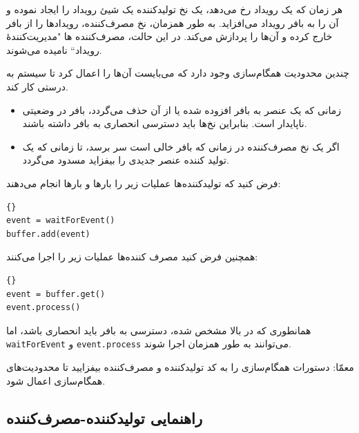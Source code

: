 \documentclass{book}
\newcommand{\clearemptydoublepage}{}%
\begin{document}
    هر زمان که یک رویداد رخ می‌دهد، یک نخ تولید‌کننده یک شیئ رویداد را ایجاد نموده و آن را به بافر رویداد می‌افزاید. 
    به طور همزمان، نخ مصرف‌کننده، رویدادها را از بافر خارج کرده و آن‌ها را پردازش می‌کند. 
    در این حالت، مصرف‌کننده ها "مدیریت‌کنندهٔ رویداد`` نامیده می‌شوند.

    چندین محدودیت همگام‌سازی وجود دارد که می‌بایست آن‌ها را اعمال کرد تا سیستم به درستی کار کند. 

\begin{itemize}

\item 
    زمانی که یک عنصر به بافر افزوده شده یا از آن حذف می‌گردد، بافر در وضعیتی ناپایدار است.
    بنابراین نخ‌ها باید دسترسی انحصاری به بافر داشته باشند.
    
\item 
    اگر یک نخ مصرف‌کننده در زمانی که بافر خالی است سر برسد، تا زمانی که یک تولید کننده عنصر جدیدی را بیفزاید مسدود می‌گردد.

\end{itemize}

    فرض کنید که تولیدکننده‌ها عملیات زیر را بارها و بارها انجام می‌دهند:

\begin{latin}
\begin{lstlisting}[title=\rl{کد پایهٔ تولیدکننده}]{}
event = waitForEvent()
buffer.add(event)
\end{lstlisting}
\end{latin}

    همچنین فرض کنید مصرف کننده‌ها عملیات زیر را اجرا می‌کنند:

\begin{latin}
\begin{lstlisting}[title=\rl{کد پایهٔ مصرف‌کننده}]{}
event = buffer.get()
event.process()
\end{lstlisting}
\end{latin}

    همانطوری که در بالا مشخص شده، دسترسی به بافر باید انحصاری باشد، 
    اما {\tt waitForEvent} و {\tt event.process} می‌توانند به طور همزمان اجرا شوند.
    

    معمّا: دستورات همگام‌سازی را به کد تولید‌کننده و مصرف‌کننده بیفزایید تا محدودیت‌های همگام‌سازی اعمال شود.

\clearemptydoublepage
\subsection{راهنمایی تولیدکننده-مصرف‌کننده}
\end{document}
